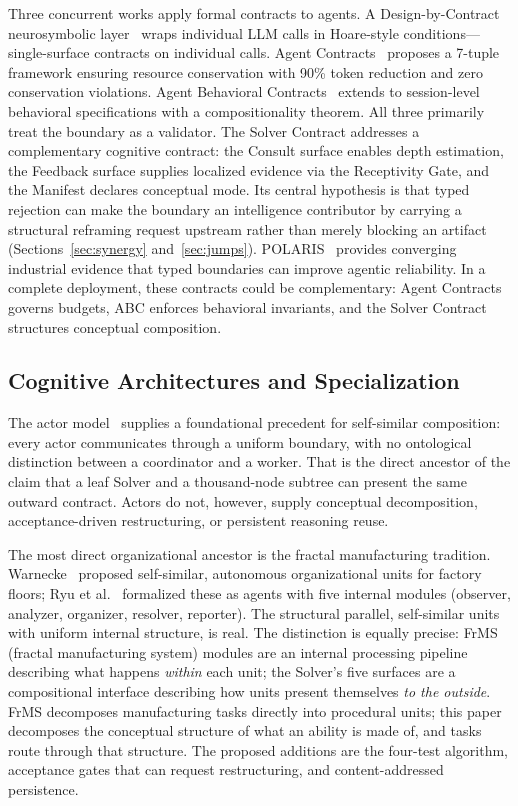 \documentclass[11pt]{article}
\begin{document}
Three concurrent works apply formal contracts to agents. A Design-by-Contract neurosymbolic layer~\cite{DbCAgents2025} wraps individual LLM calls in Hoare-style conditions---single-surface contracts on individual calls. Agent Contracts~\cite{YeTan2026agentcontracts} proposes a 7-tuple framework ensuring resource conservation with 90\% token reduction and zero conservation violations. Agent Behavioral Contracts~\cite{AgentBehavioralContracts2026} extends to session-level behavioral specifications with a compositionality theorem. All three primarily treat the boundary as a validator. The Solver Contract addresses a complementary cognitive contract: the Consult surface enables depth estimation, the Feedback surface supplies localized evidence via the Receptivity Gate, and the Manifest declares conceptual mode. Its central hypothesis is that typed rejection can make the boundary an intelligence contributor by carrying a structural reframing request upstream rather than merely blocking an artifact (Sections~\ref{sec:synergy} and~\ref{sec:jumps}). POLARIS~\cite{POLARIS2026} provides converging industrial evidence that typed boundaries can improve agentic reliability. In a complete deployment, these contracts could be complementary: Agent Contracts governs budgets, ABC enforces behavioral invariants, and the Solver Contract structures conceptual composition.

\subsection{Cognitive Architectures and Specialization}

The actor model~\cite{hewitt1973actor} supplies a foundational precedent for self-similar composition: every actor communicates through a uniform boundary, with no ontological distinction between a coordinator and a worker. That is the direct ancestor of the claim that a leaf Solver and a thousand-node subtree can present the same outward contract. Actors do not, however, supply conceptual decomposition, acceptance-driven restructuring, or persistent reasoning reuse.

The most direct organizational ancestor is the fractal manufacturing tradition. Warnecke~\cite{Warnecke1993} proposed self-similar, autonomous organizational units for factory floors; Ryu et al.~\cite{Ryu2003} formalized these as agents with five internal modules (observer, analyzer, organizer, resolver, reporter). The structural parallel, self-similar units with uniform internal structure, is real. The distinction is equally precise: FrMS (fractal manufacturing system) modules are an internal processing pipeline describing what happens \emph{within} each unit; the Solver's five surfaces are a compositional interface describing how units present themselves \emph{to the outside}. FrMS decomposes manufacturing tasks directly into procedural units; this paper decomposes the conceptual structure of what an ability is made of, and tasks route through that structure. The proposed additions are the four-test algorithm, acceptance gates that can request restructuring, and content-addressed persistence.
\end{document}
